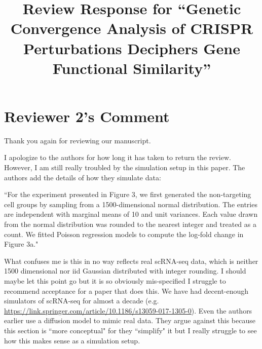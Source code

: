 \documentclass[11pt]{article}
\title{Review Response for ``Genetic Convergence Analysis of CRISPR Perturbations Deciphers Gene Functional Similarity''}
\date{\vspace{-5ex}}
\date{}  %
\theoremstyle{definition}
\begin{document}

\maketitle
\vspace{-10mm}


\newcommand{\es}{\color{teal} ES:\ }
\newcommand{\tz}{\color{blue} TZ:\ }
\newcommand{\kr}{\color{magenta} KR:\ }


\section{Reviewer 2's Comment}

Thank you again for reviewing our manuscript.

\begin{shaded}
I apologize to the authors for how long it has taken to return the review. However, I am still really troubled by the simulation setup in this paper. The authors add the details of how they simulate data:

``For the experiment presented in Figure 3, we first generated the non-targeting cell groups by
sampling from a 1500-dimensional normal distribution. The entries are independent with
marginal means of 10 and unit variances. Each value drawn from the normal distribution
was rounded to the nearest integer and treated as a count. We fitted Poisson regression
models to compute the log-fold change in Figure 3a."

What confuses me is this in no way reflects real scRNA-seq data, which is neither 1500 dimensional nor iid Gaussian distributed with integer rounding. I should maybe let this point go but it is so obviously mis-specified I struggle to recommend acceptance for a paper that does this. We have had decent-enough simulators of scRNA-seq for almost a decade (e.g. \url{https://link.springer.com/article/10.1186/s13059-017-1305-0}). Even the authors earlier use a diffusion model to mimic real data. They argue against this because this section is ``more conceptual" for they ``simplify" it but I really struggle to see how this makes sense as a simulation setup.
\end{shaded}
\end{document}
